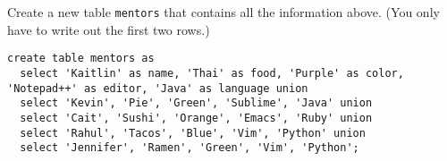 \question Create a new table \lstinline$mentors$ that contains all the information above.
(You only have to write out the first two rows.)

\begin{solution}[1in]
\begin{lstlisting}
create table mentors as
  select 'Kaitlin' as name, 'Thai' as food, 'Purple' as color, 'Notepad++' as editor, 'Java' as language union
  select 'Kevin', 'Pie', 'Green', 'Sublime', 'Java' union
  select 'Cait', 'Sushi', 'Orange', 'Emacs', 'Ruby' union
  select 'Rahul', 'Tacos', 'Blue', 'Vim', 'Python' union
  select 'Jennifer', 'Ramen', 'Green', 'Vim', 'Python';
\end{lstlisting}
\end{solution}
